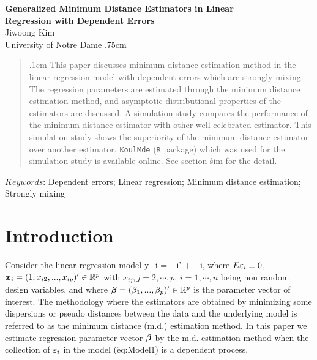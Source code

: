 \bc
{\large \bf Generalized Minimum Distance Estimators in Linear \\Regression with Dependent Errors}\\[.2cm]
{\large Jiwoong Kim\\University of Notre Dame}
\ec
\vs .75cm

\begin{abstract}
\vs .1cm
This paper discusses minimum distance estimation method in the linear regression model with dependent errors which are strongly mixing. The regression parameters are estimated through the minimum distance estimation method, and  asymptotic distributional properties of the estimators are discussed. A simulation study compares the performance of the minimum distance estimator with other well celebrated estimator. This simulation study shows the superiority of the minimum distance estimator over another estimator. \texttt{KoulMde} (\texttt{R} package) which was used for the simulation study is available online. See section \r{sim} for the detail.
\end{abstract}
\vs 0.75cm
\begin{minipage}{1\textwidth}
$Keywords$: Dependent errors; Linear regression; Minimum distance estimation; Strongly mixing
\end{minipage}





\section{Introduction}
\noindent
Consider the linear regression model
\benr\label{eq:Model1}
y_{i} =  _i'\mbf{\b} + \vep_i,
\eenr
where $E\varepsilon_i\equiv 0$, $\mbox{\boldmath $x$}_i=(1, x_{i2},...,x_{ip})'\in {\mathbb R}^{p}$ with $x_{ij},
j=2,\cdots, p,\, i= 1,\cdots, n$ being non random design variables, and where
$\mbox{\boldmath $\beta$} = (\beta_{1},...,\beta_{p})'\in {\mathbb R}^{p}$ is the parameter vector of interest. The methodology where the estimators are obtained by minimizing some dispersions or pseudo distances between the data and the underlying model is referred to as the minimum distance (m.d.) estimation method. In this paper we estimate regression parameter vector $\mbox{\boldmath $\beta$}$ by the m.d.\,\,estimation method when the collection of $\varepsilon_i$ in the model (\r{eq:Model1}) is a dependent process.

